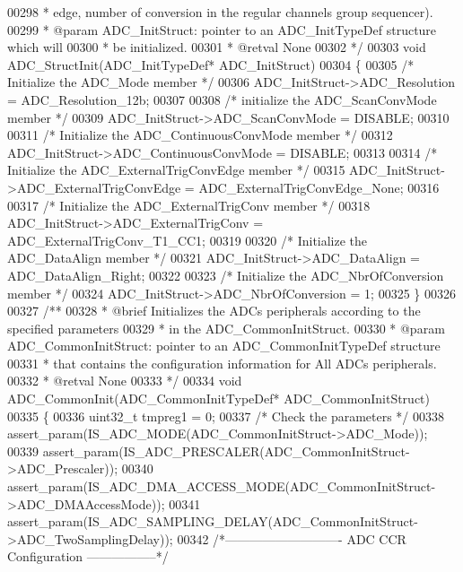 \begin{DoxyCode}
00298 \textcolor{comment}{  *         edge, number of conversion in the regular channels group sequencer).  }
00299 \textcolor{comment}{  * @param  ADC\_InitStruct: pointer to an ADC\_InitTypeDef structure which will }
00300 \textcolor{comment}{  *         be initialized.}
00301 \textcolor{comment}{  * @retval None}
00302 \textcolor{comment}{  */}
00303 \textcolor{keywordtype}{void} ADC_StructInit(ADC\_InitTypeDef* ADC\_InitStruct)
00304 \{
00305   \textcolor{comment}{/* Initialize the ADC\_Mode member */}
00306   ADC\_InitStruct->ADC_Resolution = ADC_Resolution_12b;
00307 
00308   \textcolor{comment}{/* initialize the ADC\_ScanConvMode member */}
00309   ADC\_InitStruct->ADC_ScanConvMode = DISABLE;
00310 
00311   \textcolor{comment}{/* Initialize the ADC\_ContinuousConvMode member */}
00312   ADC\_InitStruct->ADC_ContinuousConvMode = DISABLE;
00313 
00314   \textcolor{comment}{/* Initialize the ADC\_ExternalTrigConvEdge member */}
00315   ADC\_InitStruct->ADC_ExternalTrigConvEdge = ADC_ExternalTrigConvEdge_None;
00316 
00317   \textcolor{comment}{/* Initialize the ADC\_ExternalTrigConv member */}
00318   ADC\_InitStruct->ADC_ExternalTrigConv = ADC_ExternalTrigConv_T1_CC1;
00319 
00320   \textcolor{comment}{/* Initialize the ADC\_DataAlign member */}
00321   ADC\_InitStruct->ADC_DataAlign = ADC_DataAlign_Right;
00322 
00323   \textcolor{comment}{/* Initialize the ADC\_NbrOfConversion member */}
00324   ADC\_InitStruct->ADC_NbrOfConversion = 1;
00325 \}
00326 
00327 \textcolor{comment}{/**}
00328 \textcolor{comment}{  * @brief  Initializes the ADCs peripherals according to the specified parameters }
00329 \textcolor{comment}{  *         in the ADC\_CommonInitStruct.}
00330 \textcolor{comment}{  * @param  ADC\_CommonInitStruct: pointer to an ADC\_CommonInitTypeDef structure }
00331 \textcolor{comment}{  *         that contains the configuration information for  All ADCs peripherals.}
00332 \textcolor{comment}{  * @retval None}
00333 \textcolor{comment}{  */}
00334 \textcolor{keywordtype}{void} ADC_CommonInit(ADC\_CommonInitTypeDef* ADC\_CommonInitStruct)
00335 \{
00336   uint32\_t tmpreg1 = 0;
00337   \textcolor{comment}{/* Check the parameters */}
00338   assert_param(IS\_ADC\_MODE(ADC\_CommonInitStruct->ADC\_Mode));
00339   assert_param(IS\_ADC\_PRESCALER(ADC\_CommonInitStruct->ADC\_Prescaler));
00340   assert_param(IS\_ADC\_DMA\_ACCESS\_MODE(ADC\_CommonInitStruct->ADC\_DMAAccessMode));
00341   assert_param(IS\_ADC\_SAMPLING\_DELAY(ADC\_CommonInitStruct->ADC\_TwoSamplingDelay));
00342   \textcolor{comment}{/*---------------------------- ADC CCR Configuration -----------------*/}

\end{DoxyCode}
